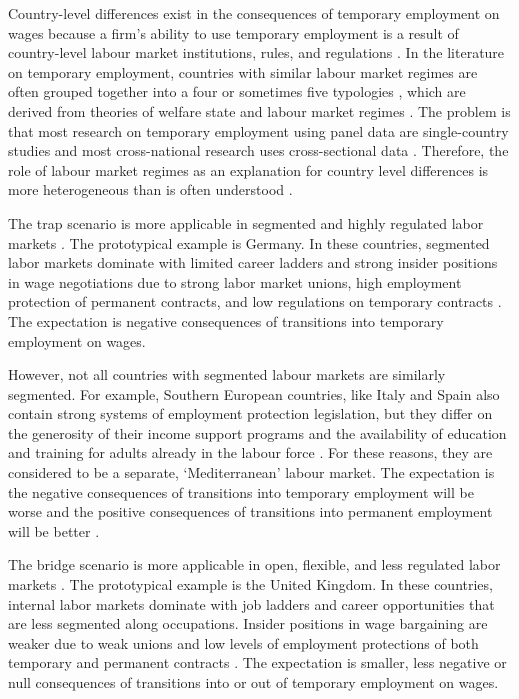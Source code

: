 \documentclass[12pt]{article}
\begin{document}
Country-level differences exist in the consequences of temporary employment on wages because a firm's ability to use temporary employment is a result of country-level labour market institutions, rules, and regulations \citep{giesecke_external_2004}.  In the literature on temporary employment, countries with similar labour market regimes are often grouped together into a four or sometimes five typologies \citep{barbieri_flexible_2009,muffels_labour_2008}, which are derived from theories of welfare state and labour market regimes \citep{esping-andersen_why_2000,korpi1985power}.  The problem is that most research on temporary employment using panel data are single-country studies and most cross-national research uses cross-sectional data \citep{latner_wage_2022}.  Therefore, the role of labour market regimes as an explanation for country level differences is more heterogeneous than is often understood \citep{fauser_gebel_2023}.  

The trap scenario is more applicable in segmented and highly regulated labor markets \citep{muffels_wilthagen_2013}.  The prototypical example is Germany.  In these countries, segmented labor markets dominate with limited career ladders and strong insider positions in wage negotiations due to strong labor market unions, high employment protection of permanent contracts, and low regulations on temporary contracts \citep{giesecke_temporary_2003}.  The expectation is negative consequences of transitions into temporary employment on wages.

However, not all countries with segmented labour markets are similarly segmented.  For example, Southern European countries, like Italy and Spain also contain strong systems of employment protection legislation, but they differ on the generosity of their income support programs and the availability of education and training for adults already in the labour force \citep{scherer_stepping-stones_2004,mertens_cost_2007}.  For these reasons, they are considered to be a separate, `Mediterranean' labour market.  The expectation is the negative consequences of transitions into temporary employment will be worse and the positive consequences of transitions into permanent employment will be better \citep{barbieri_flexible_2009}.

The bridge scenario is more applicable in open, flexible, and less regulated labor markets \citep{muffels_labour_2008}.  The prototypical example is the United Kingdom.  In these countries, internal labor markets dominate with job ladders and career opportunities that are less segmented along occupations. Insider positions in wage bargaining are weaker due to weak unions and low levels of employment protections of both temporary and permanent contracts \citep{giesecke_external_2004,gebel_early_2010}.  The expectation is smaller, less negative or null consequences of transitions into or out of temporary employment on wages.
\end{document}
